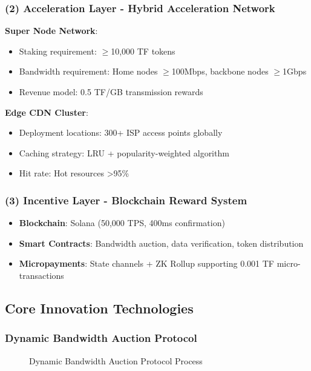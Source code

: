 \documentclass[12pt,a4paper]{article}
\begin{document}
\subsubsection{(2) Acceleration Layer - Hybrid Acceleration Network}
\textbf{Super Node Network}:
\begin{itemize}
    \item Staking requirement: $\geq$10,000 TF tokens
    \item Bandwidth requirement: Home nodes $\geq$100Mbps, backbone nodes $\geq$1Gbps
    \item Revenue model: 0.5 TF/GB transmission rewards
\end{itemize}

\textbf{Edge CDN Cluster}:
\begin{itemize}
    \item Deployment locations: 300+ ISP access points globally
    \item Caching strategy: LRU + popularity-weighted algorithm
    \item Hit rate: Hot resources >95\%
\end{itemize}

\subsubsection{(3) Incentive Layer - Blockchain Reward System}
\begin{itemize}
    \item \textbf{Blockchain}: Solana (50,000 TPS, 400ms confirmation)
    \item \textbf{Smart Contracts}: Bandwidth auction, data verification, token distribution
    \item \textbf{Micropayments}: State channels + ZK Rollup supporting 0.001 TF micro-transactions
\end{itemize}

\newpage
\subsection{Core Innovation Technologies}

\subsubsection{Dynamic Bandwidth Auction Protocol}

\begin{figure}[htbp]
\centering
{}
\caption{Dynamic Bandwidth Auction Protocol Process}
\end{figure}
\end{document}
